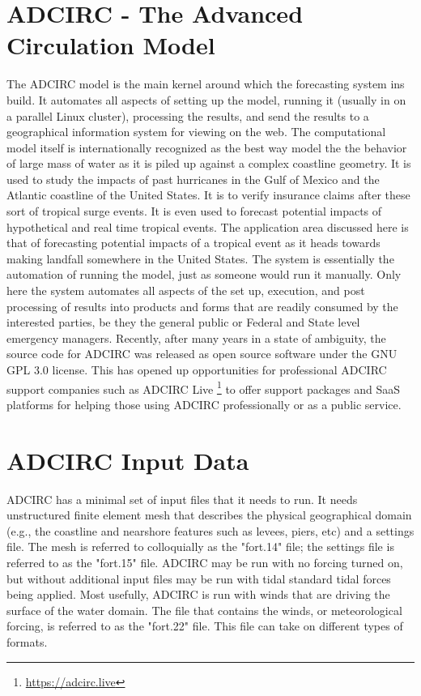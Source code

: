 \documentclass{article}
\begin{document}
\section{ADCIRC - The Advanced Circulation Model}

The ADCIRC model is the main kernel around which the forecasting system ins
build. It automates all aspects of setting up the model, running it (usually in
on a parallel Linux cluster), processing the results, and send the results to a
geographical information system for viewing on the web.  The computational model
itself is internationally recognized as the best way model the the behavior of
large mass of water as it is piled up against a complex coastline geometry. It
is used to study the impacts of past hurricanes in the Gulf of Mexico and the
Atlantic coastline of the United States. It is to verify insurance claims after
these sort of tropical surge events. It is even used to forecast potential
impacts of hypothetical and real time tropical events.  The application area
discussed here is that of forecasting potential impacts of a tropical event as
it heads towards making landfall somewhere in the United States. The system is
essentially the automation of running the model, just as someone would run it
manually. Only here the system automates all aspects of the set up, execution,
and post processing of results into products and forms that are readily consumed
by the interested parties, be they the general public or Federal and State level
emergency managers.  Recently, after many years in a state of ambiguity, the
source code for ADCIRC was released as open source software under the GNU GPL
3.0 license. This has opened up opportunities for professional ADCIRC support
companies such as ADCIRC Live \footnote{\url{https://adcirc.live}} to offer support
packages and SaaS platforms for helping those using ADCIRC professionally or as
a public service.

\section{ADCIRC Input Data}

ADCIRC has a minimal set of input files that it needs to run. It needs
unstructured finite element mesh that describes the physical geographical domain
(e.g., the coastline and nearshore features such as levees, piers, etc) and a
settings file. The mesh is referred to colloquially as the "fort.14" file; the
settings file is referred to as the "fort.15" file. ADCIRC may be run with no
forcing turned on, but without additional input files may be run with tidal
standard tidal forces being applied. Most usefully, ADCIRC is run with winds
that are driving the surface of the water domain. The file that contains the
winds, or meteorological forcing, is referred to as the "fort.22" file. This
file can take on different types of formats.
\end{document}

